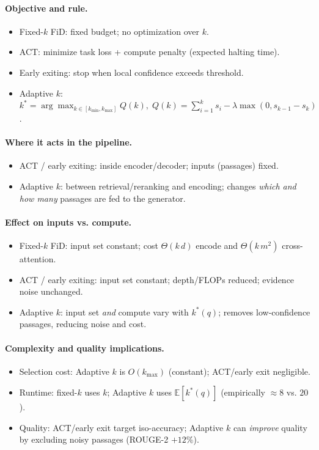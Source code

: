 \documentclass[11pt,a4paper]{article}
\begin{document}
\paragraph{Objective and rule.}
\begin{itemize}
	\item Fixed-$k$ FiD: fixed budget; no optimization over $k$.
	\item ACT: minimize task loss + compute penalty (expected halting time).
	\item Early exiting: stop when local confidence exceeds threshold.
	\item Adaptive $k$: \(k^* = \arg\max_{k\in[k_{\min},k_{\max}]} Q(k),\; Q(k)=\sum_{i=1}^k s_i - \lambda\max(0,s_{k-1}-s_k)\).
\end{itemize}

\paragraph{Where it acts in the pipeline.}
\begin{itemize}
	\item ACT / early exiting: inside encoder/decoder; inputs (passages) fixed.
	\item Adaptive $k$: between retrieval/reranking and encoding; changes \emph{which and how many} passages are fed to the generator.
\end{itemize}

\paragraph{Effect on inputs vs. compute.}
\begin{itemize}
	\item Fixed-$k$ FiD: input set constant; cost $\Theta(k\,d)$ encode and $\Theta(k\,m^2)$ cross-attention.
	\item ACT / early exiting: input set constant; depth/FLOPs reduced; evidence noise unchanged.
	\item Adaptive $k$: input set \emph{and} compute vary with $k^*(q)$; removes low-confidence passages, reducing noise and cost.
\end{itemize}

\paragraph{Complexity and quality implications.}
\begin{itemize}
	\item Selection cost: Adaptive $k$ is $O(k_{\max})$ (constant); ACT/early exit negligible.
	\item Runtime: fixed-$k$ uses $k$; Adaptive $k$ uses $\mathbb{E}[k^*(q)]$ (empirically $\approx 8$ vs. $20$).
	\item Quality: ACT/early exit target iso-accuracy; Adaptive $k$ can \emph{improve} quality by excluding noisy passages (ROUGE-2 $+12\%$).
\end{itemize}
\end{document}
